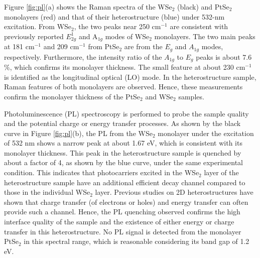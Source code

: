 \documentclass[10pt]{iopart}
\begin{document}
Figure \ref{fig:pl}(a) shows the Raman spectra of the WSe$_2$ (black) and PtSe$_2$ monolayers (red) and that of their heterostructure (blue) under 532-nm excitation. From WSe$_2$, the two peaks near 250 cm$^{-1}$ are consistent with previously reported $E_{2g}^1$ and A$_{1g}$ modes of WSe$_2$ monolayers\cite{gu2019layer,zhao2013lattice}. 
 The two main peaks at 181 cm$^{-1}$ and 209 cm$^{-1}$ from PtSe$_2$ are from the $E_g$ and $A_{1g}$ modes, respectively\cite{szydlowska2020spectroscopic,yim2016high}.  Furthermore, the intensity ratio of the $A_{1g}$ to $E_g$ peaks is about 7.6 \%, which  confirms its monolayer thickness\cite{szydlowska2020spectroscopic}.  The small feature at about 230 cm$^{-1}$ is identified as the longitudinal optical (LO) mode\cite{o2016raman}.  In the heterostructure sample, Raman features of both monolayers are observed. Hence, these measurements confirm the monolayer thickness of the PtSe$_2$ and WSe$_2$ samples.



Photoluminescence (PL) spectroscopy is performed to probe the sample quality and the potential charge or energy transfer processes. As shown by the black curve in Figure \ref{fig:pl}(b), the PL from the WSe$_2$ monolayer under the excitation of 532 nm shows a narrow peak at about 1.67 eV, which is consistent with its monolayer thickness\cite{ceballos2017separating}.  This peak in the heterostructure sample is quenched by about a factor of 4, as shown by the blue curve, under the same experimental condition. This indicates that photocarriers excited in the WSe$_2$ layer of the heterostructure sample have an additional efficient decay channel compared to those in the individual WSe$_2$ layer. Previous studies on 2D heterostructures have shown that charge transfer (of electrons or holes) and energy transfer can often provide such a channel\cite{ceballos2014ultrafast,fang2014strong,ceballos2015probing}. Hence, the PL quenching observed confirms the high interface quality of the sample and the existence of either energy or charge transfer in this heterostructure. No PL signal is detected from the monolayer PtSe$_2$ in this spectral range, which is reasonable considering its band gap of 1.2 eV.
\end{document}
